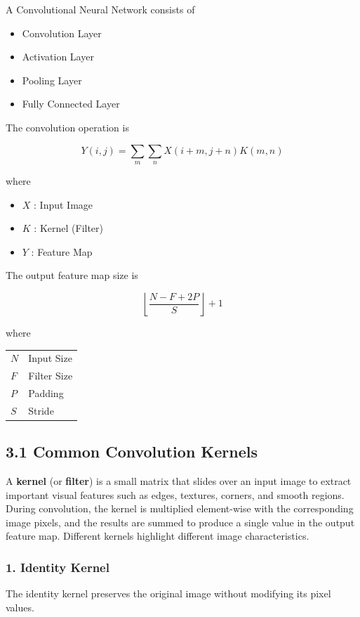 \documentclass[11pt]{article}
\begin{document}
A Convolutional Neural Network consists of

\begin{itemize}
\item Convolution Layer
\item Activation Layer
\item Pooling Layer
\item Fully Connected Layer
\end{itemize}

The convolution operation is

\[
Y(i,j)=\sum_m\sum_n X(i+m,j+n)K(m,n)
\]

where

\begin{itemize}
\item $X$ : Input Image
\item $K$ : Kernel (Filter)
\item $Y$ : Feature Map
\end{itemize}

The output feature map size is

\[
\left\lfloor\frac{N-F+2P}{S}\right\rfloor+1
\]

where

\begin{tabular}{ll}
$N$ & Input Size\\
$F$ & Filter Size\\
$P$ & Padding\\
$S$ & Stride
\end{tabular}

\subsection*{3.1 Common Convolution Kernels}

A \textbf{kernel} (or \textbf{filter}) is a small matrix that slides over an input image to extract important visual features such as edges, textures, corners, and smooth regions. During convolution, the kernel is multiplied element-wise with the corresponding image pixels, and the results are summed to produce a single value in the output feature map. Different kernels highlight different image characteristics.

\subsubsection*{1. Identity Kernel}

The identity kernel preserves the original image without modifying its pixel values.
\end{document}
